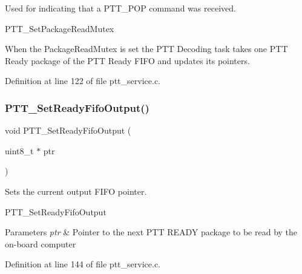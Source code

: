 Used for indicating that a P\+T\+T\+\_\+\+P\+OP command was received. 

P\+T\+T\+\_\+\+Set\+Package\+Read\+Mutex

When the Package\+Read\+Mutex is set the P\+TT Decoding task takes one P\+TT Ready package of the P\+TT Ready F\+I\+FO and updates its pointers. 

Definition at line 122 of file ptt\+\_\+service.\+c.

\mbox{\label{group___p_t_t___service_ga21b2bb3dfbb265ec298c3831be5ec743}} 
\subsubsection{\texorpdfstring{P\+T\+T\+\_\+\+Set\+Ready\+Fifo\+Output()}{PTT\_SetReadyFifoOutput()}}
{\footnotesize\ttfamily void P\+T\+T\+\_\+\+Set\+Ready\+Fifo\+Output (\begin{DoxyParamCaption}\item[{uint8\+\_\+t $\ast$}]{ptr }\end{DoxyParamCaption})}



Sets the current output F\+I\+FO pointer. 

P\+T\+T\+\_\+\+Set\+Ready\+Fifo\+Output


\begin{DoxyParams}{Parameters}
{\em ptr} & Pointer to the next P\+TT R\+E\+A\+DY package to be read by the on-\/board computer \\
\hline
\end{DoxyParams}


Definition at line 144 of file ptt\+\_\+service.\+c.

